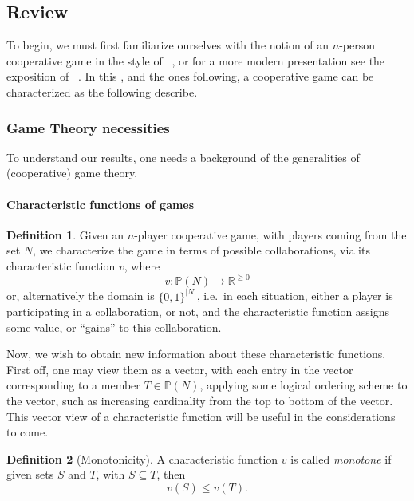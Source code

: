 \documentclass[12pt,letterpaper,final]{article}
\theoremstyle{plain}
\theoremstyle{plain}
\theoremstyle{plain}
\theoremstyle{plain}
\theoremstyle{plain}
\theoremstyle{plain}
\theoremstyle{plain}
\theoremstyle{definition}
\newtheorem{definition}{Definition}[section]
\theoremstyle{definition}
\theoremstyle{definition}
\theoremstyle{definition}
\theoremstyle{definition}
\theoremstyle{remark}
\theoremstyle{remark}
\theoremstyle{remark}
\theoremstyle{remark}
\begin{document}
\subsection{Review}\label{sec:literature-review}

To begin, we must first familiarize ourselves with the notion of an
\(n\)-person cooperative game in the style of
\citeauthor{Shapley53}~\cite{Shapley53}, or for a more modern
presentation see the exposition of  \citeauthor{Maschler13}~\cite{Maschler13}. In this
, and the ones following, a cooperative game can 
be characterized as the following  describe.

\subsubsection{Game Theory necessities}

To understand our results, one needs a background of the generalities
of (cooperative) game theory.

\paragraph{Characteristic functions of games}

\begin{definition}
  Given an \(n\)-player cooperative game, with players coming from the
  set \(N\), we characterize the game in
  terms of possible collaborations, via its characteristic function
  \(v\), where
  \[
    v:\mathbb{P}\left(N\right) \rightarrow
    \mathbb{R}^{\geq 0} 
  \]
  or, alternatively the domain is \(\{0,1\}^{|N|}\),
  i.e.\ in each situation, either a player is participating in a
  collaboration, or not, and the characteristic function assigns some
  value, or ``gains'' to this collaboration.
\end{definition}

Now, we wish to obtain new information about these
characteristic functions. First off, one may view them as a vector,
with each entry in the vector corresponding to a member 
\(T \in \mathbb{P}\left(N\right)\), applying some logical
ordering scheme to the vector, such as increasing cardinality from the
top to bottom of the vector. This vector view of a characteristic
function will be useful in the
considerations to come.

\begin{definition}[Monotonicity]\label{def:monotone}
  A characteristic function \(v\) is called \emph{monotone} if given sets
  \(S\) and \(T\), with
  \(S\subseteq T\), then
  \[
    v(S) \leq v(T).
  \]
\end{definition}
\end{document}
